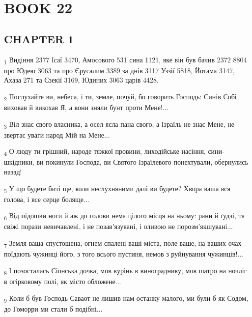 \section{BOOK 22}
\subsection{CHAPTER 1}
\begin{tcolorbox}
\textsubscript{1} Видіння 2377 Ісаї 3470, Амосового 531 сина 1121, яке він був бачив 2372 8804 про Юдею 3063 та про Єрусалим 3389 за днів 3117 Уззії 5818, Йотама 3147, Ахаза 271 та Єзекії 3169, Юдиних 3063 царів 4428.
\end{tcolorbox}
\begin{tcolorbox}
\textsubscript{2} Послухайте ви, небеса, і ти, земле, почуй, бо говорить Господь: Синів Собі виховав й викохав Я, а вони зняли бунт проти Мене!...
\end{tcolorbox}
\begin{tcolorbox}
\textsubscript{3} Віл знає свого власника, а осел ясла пана свого, а Ізраїль не знає Мене, не звертає уваги народ Мій на Мене...
\end{tcolorbox}
\begin{tcolorbox}
\textsubscript{4} О люду ти грішний, народе тяжкої провини, лиходійське насіння, сини-шкідники, ви покинули Господа, ви Святого Ізраїлевого понехтували, обернулись назад!
\end{tcolorbox}
\begin{tcolorbox}
\textsubscript{5} У що будете биті ще, коли неслухняними далі ви будете? Хвора ваша вся голова, і все серце боляще...
\end{tcolorbox}
\begin{tcolorbox}
\textsubscript{6} Від підошви ноги й аж до голови нема цілого місця на ньому: рани й ґудзі, та свіжі порази невичавлені, і не позав'язувані, і оливою не порозм'якшувані...
\end{tcolorbox}
\begin{tcolorbox}
\textsubscript{7} Земля ваша спустошена, огнем спалені ваші міста, поле ваше, на ваших очах поїдають чужинці його, з того всього пустиня, немов з руйнування чужинців!...
\end{tcolorbox}
\begin{tcolorbox}
\textsubscript{8} І позосталась Сіонська дочка, мов курінь в винограднику, мов шатро на ночліг в огірковому полі, як місто обложене...
\end{tcolorbox}
\begin{tcolorbox}
\textsubscript{9} Коли б був Господь Саваот не лишив нам останку малого, ми були б як Содом, до Гоморри ми стали б подібні...
\end{tcolorbox}
